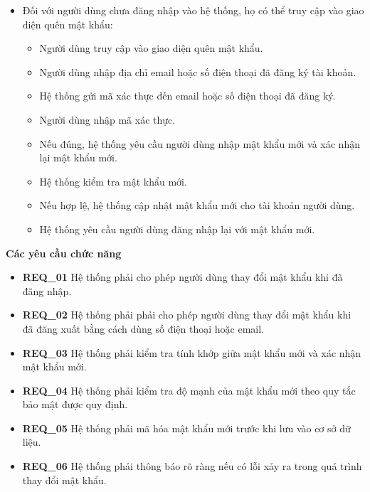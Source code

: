 \begin{itemize}
\begin{itemize}
    \end{itemize}

    \item Đối với người dùng chưa đăng nhập vào hệ thống, họ có thể truy cập vào giao diện quên mật khẩu:
    \begin{itemize}
        \item Người dùng truy cập vào giao diện quên mật khẩu.
        \item Người dùng nhập địa chỉ email hoặc số điện thoại đã đăng ký tài khoản.
        \item Hệ thống gửi mã xác thực đến email hoặc số điện thoại đã đăng ký.
        \item Người dùng nhập mã xác thực.
        \item Nếu đúng, hệ thống yêu cầu người dùng nhập mật khẩu mới và xác nhận lại mật khẩu mới.
        \item Hệ thống kiểm tra mật khẩu mới.
        \item Nếu hợp lệ, hệ thống cập nhật mật khẩu mới cho tài khoản người dùng.
        \item Hệ thống yêu cầu người dùng đăng nhập lại với mật khẩu mới.
    \end{itemize}
\end{itemize}

\noindent \textbf{Các yêu cầu chức năng}

\begin{itemize}

\item \textbf{REQ\_01} Hệ thống phải cho phép người dùng thay đổi mật khẩu khi đã đăng nhập.

\item \textbf{REQ\_02} Hệ thống phải phải cho phép người dùng thay đổi mật khẩu khi đã đăng xuất bằng cách dùng số điện thoại hoặc email.

\item \textbf{REQ\_03} Hệ thống phải kiểm tra tính khớp giữa mật khẩu mới và xác nhận mật khẩu mới.

\item \textbf{REQ\_04} Hệ thống phải kiểm tra độ mạnh của mật khẩu mới theo quy tắc bảo mật được quy định.

\item \textbf{REQ\_05} Hệ thống phải mã hóa mật khẩu mới trước khi lưu vào cơ sở dữ liệu.

\item \textbf{REQ\_06} Hệ thống phải thông báo rõ ràng nếu có lỗi xảy ra trong quá trình thay đổi mật khẩu.

\end{itemize}